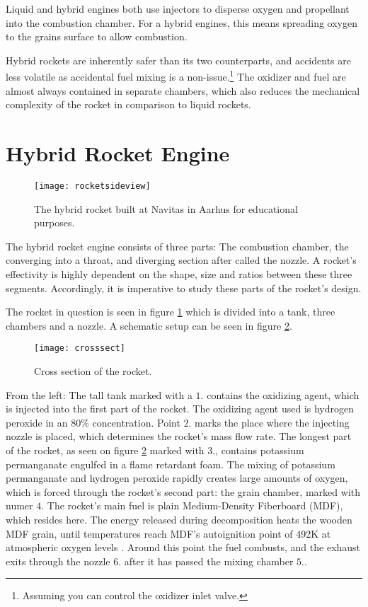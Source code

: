 	Liquid and hybrid engines both use injectors to disperse oxygen and propellant into the combustion chamber. For a hybrid engines, this means spreading oxygen to the grains surface to allow combustion.

	Hybrid rockets are inherently safer than its two counterparts, and accidents are less volatile as accidental fuel mixing is a non-issue.\footnote{Assuming you can control the oxidizer inlet valve.} The oxidizer and fuel are almost always contained in separate chambers, which also reduces the mechanical complexity of the rocket in comparison to liquid rockets.

\section{Hybrid Rocket Engine}

\begin{figure}
	\centering
	\texttt{[image: rocketsideview]}
	\caption{The hybrid rocket built at Navitas in Aarhus for educational purposes.}
	\label{fig:rocketpic}
\end{figure}

	The hybrid rocket engine consists of three parts: The combustion chamber, the converging into a throat, and diverging section after called the nozzle. A rocket's effectivity is highly dependent on the shape, size and ratios between these three segments. Accordingly, it is imperative to study these parts of the rocket's design.

	The rocket in question is seen in figure \ref{fig:rocketpic} which is divided into a tank, three chambers and a nozzle. A schematic setup can be seen in figure \ref{fig:crosssect}.

	\begin{figure}
		\texttt{[image: crosssect]}
		\caption{Cross section of the rocket.}
		\label{fig:crosssect}
	\end{figure}

	From the left: The tall tank marked with a $1.$ contains the oxidizing agent, which is injected into the first part of the rocket. The oxidizing agent used is hydrogen peroxide in an $80\%$ concentration. Point $2.$ marks the place where the injecting nozzle is placed, which determines the rocket's mass flow rate. The longest part of the rocket, as seen on figure \ref{fig:crosssect} marked with $3.$, contains potassium permanganate engulfed in a flame retardant foam. The mixing of potassium permanganate and hydrogen peroxide rapidly creates large amounts of oxygen, which is forced through the rocket's second part: the grain chamber, marked with numer $4.$ The rocket's main fuel is plain Medium-Density Fiberboard (MDF), which resides here. The energy released during decomposition heats the wooden MDF grain, until temperatures reach MDF's autoignition point of 492K at atmospheric oxygen levels \cite{mdfAIT}. Around this point the fuel combusts, and the exhaust exits through the nozzle $6.$ after it has passed the mixing chamber $5.$.

